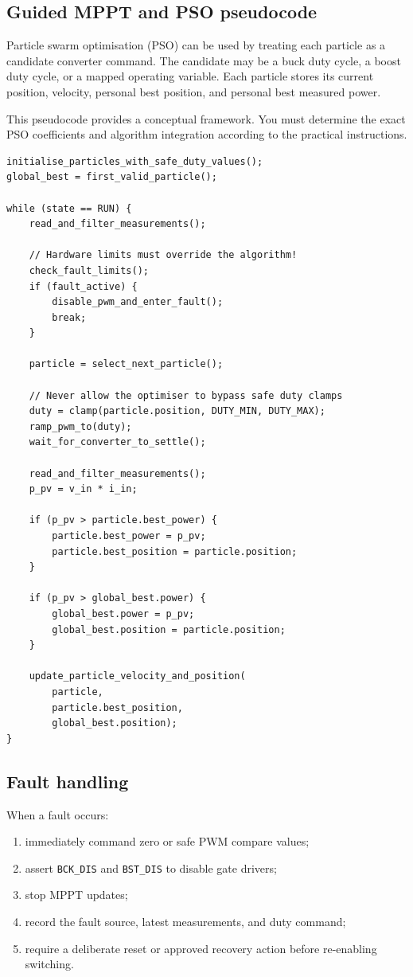 \documentclass[11pt,a4paper]{article}
\newcommand{\code}[1]{\texttt{#1}}
\begin{document}
\subsection{Guided MPPT and PSO pseudocode}

Particle swarm optimisation (PSO) can be used by treating each particle as a candidate converter command. The candidate may be a buck duty cycle, a boost duty cycle, or a mapped operating variable. Each particle stores its current position, velocity, personal best position, and personal best measured power.

This pseudocode provides a conceptual framework. You must determine the exact PSO coefficients and algorithm integration according to the practical instructions.

\begin{lstlisting}[caption={Guided PSO-style MPPT structure}]
initialise_particles_with_safe_duty_values();
global_best = first_valid_particle();

while (state == RUN) {
    read_and_filter_measurements();
    
    // Hardware limits must override the algorithm!
    check_fault_limits();
    if (fault_active) {
        disable_pwm_and_enter_fault();
        break;
    }

    particle = select_next_particle();
    
    // Never allow the optimiser to bypass safe duty clamps
    duty = clamp(particle.position, DUTY_MIN, DUTY_MAX);
    ramp_pwm_to(duty);
    wait_for_converter_to_settle();

    read_and_filter_measurements();
    p_pv = v_in * i_in;

    if (p_pv > particle.best_power) {
        particle.best_power = p_pv;
        particle.best_position = particle.position;
    }

    if (p_pv > global_best.power) {
        global_best.power = p_pv;
        global_best.position = particle.position;
    }

    update_particle_velocity_and_position(
        particle,
        particle.best_position,
        global_best.position);
}
\end{lstlisting}

\subsection{Fault handling}

When a fault occurs:
\begin{enumerate}
  \item immediately command zero or safe PWM compare values;
  \item assert \code{BCK\_DIS} and \code{BST\_DIS} to disable gate drivers;
  \item stop MPPT updates;
  \item record the fault source, latest measurements, and duty command;
  \item require a deliberate reset or approved recovery action before re-enabling switching.
\end{enumerate}
\end{document}
